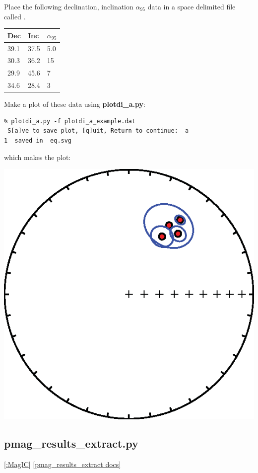 \documentclass[11pt]{book}
\begin{document}
{{Place the following declination, inclination $\alpha_{95}$ data in a space delimited file called .

\begin{tabular}{lll}
\hline
Dec\qquad &Inc\qquad &$\alpha_{95}$\\
\hline
39.1 \qquad & 37.5 \qquad & 5.0\\
30.3 \qquad & 36.2 \qquad & 15\\
29.9 \qquad & 45.6 \qquad & 7\\
34.6 \qquad & 28.4 \qquad & 3\\
\hline
\end{tabular}

Make a plot of these data using {\bf plotdi\_a.py}:

\begin{verbatim}
% plotdi_a.py -f plotdi_a_example.dat
 S[a]ve to save plot, [q]uit, Return to continue:  a
1  saved in  eq.svg
\end{verbatim}
\noindent  which makes the plot:


  \includegraphics[width=12 cm]{EPSfiles/plotdi-a-example.eps}


\subsection{pmag\_results\_extract.py}
\href{#MagiC}{[:MagIC}]
\href{https://github.com/PmagPy/PmagPy/blob/master/programs/pmag_results_extract.py}{[pmag\_results\_extract docs]}

}}
\end{document}
